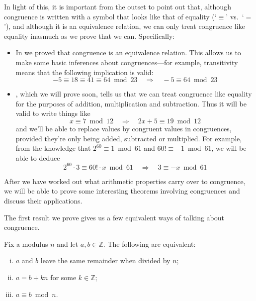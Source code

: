 In light of this, it is important from the outset to point out that, although congruence is written with a symbol that looks like that of equality (`$\equiv$' vs.\ `$=$'), and although it is an equivalence relation, we can only treat congruence like equality inasmuch as we prove that we can. Specifically:
\begin{itemize}
\item In  we proved that congruence is an equivalence relation. This allows us to make some basic inferences about congruences---for example, transitivity means that the following implication is valid:
\[ -5 \equiv 18 \equiv 41 \equiv 64 \bmod 23 \quad \Rightarrow \quad -5 \equiv 64 \bmod 23 \]
\item {}, which we will prove soon, tells us that we can treat congruence like equality for the purposes of addition, multiplication and subtraction. Thus it will be valid to write things like
\[ x \equiv 7 \bmod 12 \quad \Rightarrow \quad 2x+5 \equiv 19 \bmod 12 \]
and we'll be able to replace values by congruent values in congruences, provided they're only being added, subtracted or multiplied. For example, from the knowledge that $2^{60} \equiv 1 \bmod 61$ and $60! \equiv -1 \bmod 61$, we will be able to deduce
\[ 2^{60} \cdot 3 \equiv 60! \cdot x \bmod 61 \quad \Rightarrow \quad 3 \equiv -x \bmod 61 \]
\end{itemize}

After we have worked out what arithmetic properties carry over to congruence, we will be able to prove some interesting theorems involving congruences and discuss their applications.

The first result we prove gives us a few equivalent ways of talking about congruence.

\begin{proposition}
\label{propModAsDivDiff}
Fix a modulus $n$ and let $a,b \in \mathbb{Z}$. The following are equivalent:
\begin{enumerate}[(i)]
\item $a$ and $b$ leave the same remainder when divided by $n$;
\item $a=b+kn$ for some $k \in \mathbb{Z}$;
\item $a \equiv b \bmod n$.
\end{enumerate}
\end{proposition}

